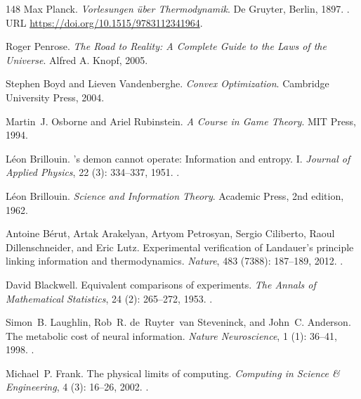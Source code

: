 \documentclass[11pt]{article}
\theoremstyle{plain}
\theoremstyle{definition}
\theoremstyle{remark}
\begin{document}
\begin{thebibliography}{148}
Max Planck.
\newblock \emph{Vorlesungen {\"u}ber Thermodynamik}.
\newblock De Gruyter, Berlin, 1897.
\newblock {}.
\newblock URL \url{https://doi.org/10.1515/9783112341964}.

Roger Penrose.
\newblock \emph{The Road to Reality: A Complete Guide to the Laws of the
  Universe}.
\newblock Alfred A. Knopf, 2005.

Stephen Boyd and Lieven Vandenberghe.
\newblock \emph{Convex Optimization}.
\newblock Cambridge University Press, 2004.

Martin~J. Osborne and Ariel Rubinstein.
\newblock \emph{A Course in Game Theory}.
\newblock MIT Press, 1994.

L{\'e}on Brillouin.
's demon cannot operate: Information and entropy. {I}.
\newblock \emph{Journal of Applied Physics}, 22 (3):
  334--337, 1951.
\newblock {}.

L{\'e}on Brillouin.
\newblock \emph{Science and Information Theory}.
\newblock Academic Press, 2nd edition, 1962.

Antoine B{\'e}rut, Artak Arakelyan, Artyom Petrosyan, Sergio Ciliberto, Raoul
  Dillenschneider, and Eric Lutz.
\newblock Experimental verification of {Landauer}'s principle linking
  information and thermodynamics.
\newblock \emph{Nature}, 483 (7388): 187--189, 2012.
\newblock {}.

David Blackwell.
\newblock Equivalent comparisons of experiments.
\newblock \emph{The Annals of Mathematical Statistics}, 24
  (2): 265--272, 1953.
\newblock {}.

Simon~B. Laughlin, Rob~R. de~Ruyter~van Steveninck, and John~C. Anderson.
\newblock The metabolic cost of neural information.
\newblock \emph{Nature Neuroscience}, 1 (1): 36--41, 1998.
\newblock {}.

Michael~P. Frank.
\newblock The physical limits of computing.
\newblock \emph{Computing in Science \& Engineering}, 4 (3):
  16--26, 2002.
\newblock {}.


\end{thebibliography}
\end{document}
